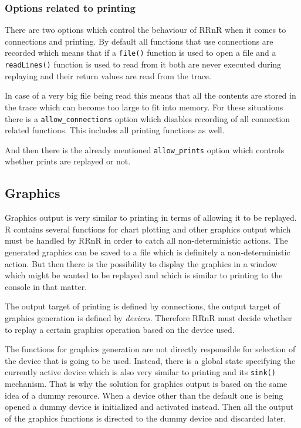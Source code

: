 \documentclass[thesis=M,english,hidelinks]{FITthesis}[2012/10/20]
\begin{document}
			\subsubsection{Options related to printing}
			There are two options which control the behaviour of RRnR when it comes to connections and printing. By default all functions that use connections are recorded which means that if a \lstinline|file()| function is used to open a file and a \lstinline|readLines()| function is used to read from it both are never executed during replaying and their return values are read from the trace.\par
			
			In case of a very big file being read this means that all the contents are stored in the trace which can become too large to fit into memory. For these situations there is a \lstinline|allow_connections| option which disables recording of all connection related functions. This includes all printing functions as well.\par
			
			And then there is the already mentioned \lstinline|allow_prints| option which controls whether prints are replayed or not.\par
			
		\subsection{Graphics}
		Graphics output is very similar to printing in terms of allowing it to be replayed. R contains several functions for chart plotting and other graphics output which must be handled by RRnR in order to catch all non-deterministic actions. The generated graphics can be saved to a file which is definitely a non-deterministic action. But then there is the possibility to display the graphics in a window which might be wanted to be replayed and which is similar to printing to the console in that matter.\par
		
		The output target of printing is defined by connections, the output target of graphics generation is defined by \emph{devices}. Therefore RRnR must decide whether to replay a certain graphics operation based on the device used.\par
		
		The functions for graphics generation are not directly responsible for selection of the device that is going to be used. Instead, there is a global state specifying the currently active device which is also very similar to printing and its \lstinline|sink()| mechanism. That is why the solution for graphics output is based on the same idea of a dummy resource. When a device other than the default one is being opened a dummy device is initialized and activated instead. Then all the output of the graphics functions is directed to the dummy device and discarded later.\par
		
\end{document}
